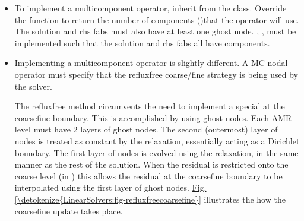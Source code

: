 \documentclass[letterpaper,10pt,english]{sphinxmanual}
\begin{document}
\begin{itemize}
\item {} 
\sphinxAtStartPar
To implement a multi\sphinxhyphen{}component  operator, inherit from the  class.
Override the  function to return the number of components ()that the operator will use.
The solution and rhs fabs must also have at least one ghost node.
, ,  must be implemented such that the solution and rhs fabs all have  components.

\item {} 
\sphinxAtStartPar
Implementing a multi\sphinxhyphen{}component  operator is slightly different.
A MC nodal operator must specify that the reflux\sphinxhyphen{}free coarse/fine strategy is being used by the solver.

\begin{sphinxVerbatim}[commandchars=\\\{\}]
\end{sphinxVerbatim}

\sphinxAtStartPar
The reflux\sphinxhyphen{}free method circumvents the need to implement a special  at the coarse\sphinxhyphen{}fine boundary.
This is accomplished by using ghost nodes.
Each AMR level must have 2 layers of ghost nodes.
The second (outermost) layer of nodes is treated as constant by the relaxation, essentially acting as a Dirichlet boundary.
The first layer of nodes is evolved using the relaxation, in the same manner as the rest of the solution.
When the residual is restricted onto the coarse level (in ) this allows the residual at the coarse\sphinxhyphen{}fine boundary to be interpolated using the first layer of ghost nodes.
\hyperref[\detokenize{LinearSolvers:fig-refluxfreecoarsefine}]{Fig.\@ \ref{\detokenize{LinearSolvers:fig-refluxfreecoarsefine}}} illustrates the how the coarse\sphinxhyphen{}fine update takes place.

\begin{figure}[htbp]
\centering
\capstart


\end{figure}
\end{itemize}
\end{document}
